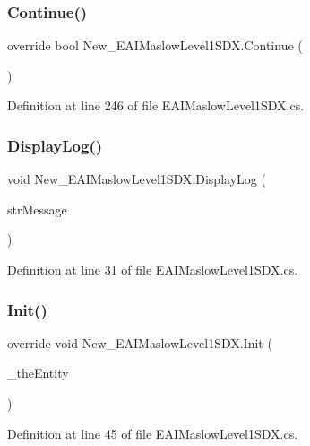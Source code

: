 \subsubsection{\texorpdfstring{Continue()}{Continue()}}
{\footnotesize\ttfamily override bool New\+\_\+\+E\+A\+I\+Maslow\+Level1\+S\+D\+X.\+Continue (\begin{DoxyParamCaption}{ }\end{DoxyParamCaption})}



Definition at line 246 of file E\+A\+I\+Maslow\+Level1\+S\+D\+X.\+cs.

\mbox{\label{class_new___e_a_i_maslow_level1_s_d_x_a5675ba805574359a549eec08d6d6a7c9}} 
\subsubsection{\texorpdfstring{DisplayLog()}{DisplayLog()}}
{\footnotesize\ttfamily void New\+\_\+\+E\+A\+I\+Maslow\+Level1\+S\+D\+X.\+Display\+Log (\begin{DoxyParamCaption}\item[{String}]{str\+Message }\end{DoxyParamCaption})}



Definition at line 31 of file E\+A\+I\+Maslow\+Level1\+S\+D\+X.\+cs.

\mbox{\label{class_new___e_a_i_maslow_level1_s_d_x_a3f62acd1ae136e5f827b8348b0ebd88e}} 
\subsubsection{\texorpdfstring{Init()}{Init()}}
{\footnotesize\ttfamily override void New\+\_\+\+E\+A\+I\+Maslow\+Level1\+S\+D\+X.\+Init (\begin{DoxyParamCaption}\item[{Entity\+Alive}]{\+\_\+the\+Entity }\end{DoxyParamCaption})}



Definition at line 45 of file E\+A\+I\+Maslow\+Level1\+S\+D\+X.\+cs.

